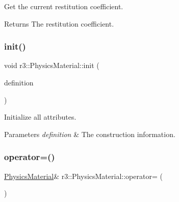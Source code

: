 Get the current restitution coefficient. 

\begin{DoxyReturn}{Returns}
The restitution coefficient. 
\end{DoxyReturn}
\mbox{\label{classr3_1_1_physics_material_a13509f5494d00fdd5356ca6101c620ac}} 
\subsubsection{\texorpdfstring{init()}{init()}}
{\footnotesize\ttfamily void r3\+::\+Physics\+Material\+::init (\begin{DoxyParamCaption}\item[{const \mbox{\hyperlink{structr3_1_1_physics_material_def}{Physics\+Material\+Def}} \&}]{definition }\end{DoxyParamCaption})}



Initialize all attributes. 


\begin{DoxyParams}{Parameters}
{\em definition} & The construction information. \\
\hline
\end{DoxyParams}
\mbox{\label{classr3_1_1_physics_material_a2c2b9752b5d5305ca2189e91fb8979e6}} 
\subsubsection{\texorpdfstring{operator=()}{operator=()}}
{\footnotesize\ttfamily \mbox{\hyperlink{classr3_1_1_physics_material}{Physics\+Material}}\& r3\+::\+Physics\+Material\+::operator= (\begin{DoxyParamCaption}\item[{const \mbox{\hyperlink{classr3_1_1_physics_material}{Physics\+Material}} \&}]{ }\end{DoxyParamCaption})\hspace{0.3cm}{\ttfamily [default]}}

\mbox{\label{classr3_1_1_physics_material_a8193e719476e1b22ba61b9cd15066437}} 
